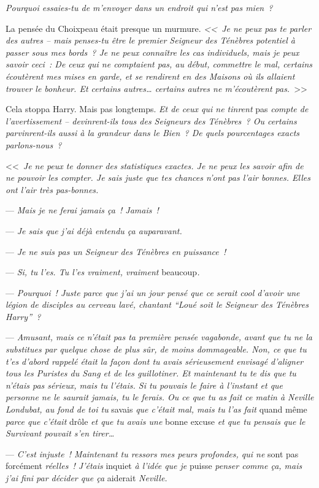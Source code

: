 \emph{Pourquoi essaies-tu de m'envoyer dans un endroit qui n'est pas mien~?}

La pensée du Choixpeau était presque un murmure. \emph{<<~Je ne peux pas te parler des autres -- mais penses-tu être le premier Seigneur des Ténèbres potentiel à passer sous mes bords~? Je ne peux connaître les cas individuels, mais je peux savoir ceci~: De ceux qui ne comptaient pas, au début, commettre le mal, certains écoutèrent mes mises en garde, et se rendirent en des Maisons où ils allaient trouver le bonheur. Et certains autres… certains autres ne m'écoutèrent pas.}~>>

Cela stoppa Harry. Mais pas longtemps. \emph{Et de ceux qui ne tinrent} pas \emph{compte de l'avertissement -- devinrent-ils tous des Seigneurs des Ténèbres~? Ou certains parvinrent-ils aussi à la grandeur dans le Bien~? De quels pourcentages exacts parlons-nous~?}

<<~\emph{Je ne peux te donner des statistiques exactes. Je ne peux les savoir afin de ne pouvoir les compter. Je sais juste que tes chances n'ont pas l'air bonnes. Elles ont l'air très pas-bonnes.}

--- \emph{Mais je ne ferai jamais ça~! Jamais~!}

--- \emph{Je sais que j'ai déjà entendu ça auparavant.}

--- \emph{Je ne suis pas un Seigneur des Ténèbres en puissance~!}

--- \emph{Si, tu l'es. Tu l'es vraiment, vraiment} beaucoup\emph{.}

--- \emph{Pourquoi~! Juste parce que j'ai un jour pensé que ce serait cool d'avoir une légion de disciples au cerveau lavé, chantant “Loué soit le Seigneur des Ténèbres Harry”~?}

--- \emph{Amusant, mais ce n'était pas ta première pensée vagabonde, avant que tu ne la substitues par quelque chose de plus sûr, de moins dommageable. Non, ce que tu t'es d'abord rappelé était la façon dont tu avais sérieusement envisagé d'aligner tous les Puristes du Sang et de les guillotiner. Et maintenant tu te dis que tu n'étais pas sérieux, mais tu l'étais. Si tu pouvais le faire à l'instant et que personne ne le saurait jamais, tu le ferais. Ou ce que tu as fait ce matin à Neville Londubat, au fond de toi tu} savais \emph{que c'était mal, mais tu l'as fait} quand même \emph{parce que c'était} drôle \emph{et que tu avais une} bonne excuse \emph{et que tu pensais que le Survivant pouvait s'en tirer…}

--- \emph{C'est injuste~! Maintenant tu ressors mes peurs profondes, qui ne} sont pas forcément \emph{réelles~! J'étais} inquiet \emph{à l'idée que je} puisse \emph{penser comme ça, mais j'ai fini par décider que ça} aiderait \emph{Neville.}

